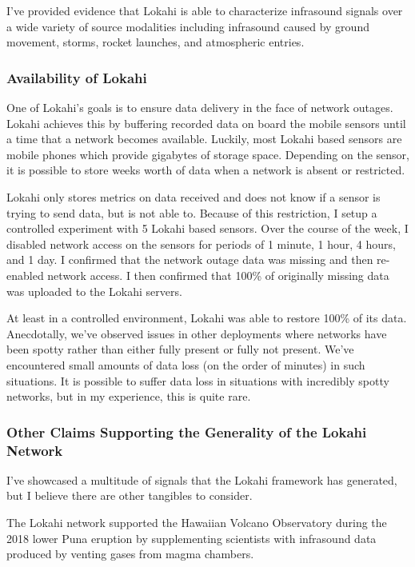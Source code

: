 I've provided evidence that Lokahi is able to characterize infrasound signals over a wide variety of source modalities including infrasound caused by ground movement, storms, rocket launches, and atmospheric entries.

\subsubsection{Availability of Lokahi}

One of Lokahi's goals is to ensure data delivery in the face of network outages. Lokahi achieves this by buffering recorded data on board the mobile sensors until a time that a network becomes available. Luckily, most Lokahi based sensors are mobile phones which provide gigabytes of storage space. Depending on the sensor, it is possible to store weeks worth of data when a network is absent or restricted.

Lokahi only stores metrics on data received and does not know if a sensor is trying to send data, but is not able to. Because of this restriction, I setup a controlled experiment with 5 Lokahi based sensors. Over the course of the week, I disabled network access on the sensors for periods of 1 minute, 1 hour, 4 hours, and 1 day. I confirmed that the network outage data was missing and then re-enabled network access. I then confirmed that 100\% of originally missing data was uploaded to the Lokahi servers.

At least in a controlled environment, Lokahi was able to restore 100\% of its data. Anecdotally, we've observed issues in other deployments where networks have been spotty rather than either fully present or fully not present. We've encountered small amounts of data loss (on the order of minutes) in such situations. It is possible to suffer data loss in situations with incredibly spotty networks, but in my experience, this is quite rare.

\subsubsection{Other Claims Supporting the Generality of the Lokahi Network}\label{subsec:other-claims-supporting-the-generality-of-the-lokahi-network}

I've showcased a multitude of signals that the Lokahi framework has generated, but I believe there are other tangibles to consider.

The Lokahi network supported the Hawaiian Volcano Observatory during the 2018 lower Puna eruption by supplementing scientists with infrasound data produced by venting gases from magma chambers.

